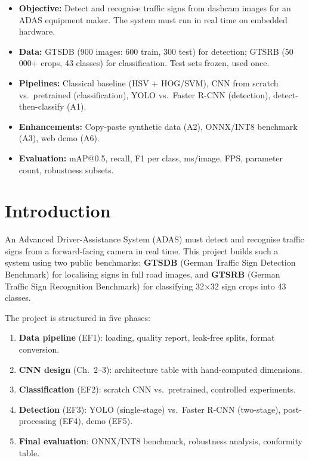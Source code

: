 \documentclass[12pt,a4paper]{article}
\begin{document}
\begin{keybox}[title=Project Summary]
\begin{itemize}[leftmargin=1.5em, itemsep=2pt]
  \item \textbf{Objective:} Detect and recognise traffic signs from dashcam images for an ADAS equipment maker. The system must run in real time on embedded hardware.
  \item \textbf{Data:} GTSDB (900 images: 600 train, 300 test) for detection; GTSRB (50\,000+ crops, 43 classes) for classification. Test sets frozen, used once.
  \item \textbf{Pipelines:} Classical baseline (HSV + HOG/SVM), CNN from scratch vs.\ pretrained (classification), YOLO vs.\ Faster R-CNN (detection), detect-then-classify (A1).
  \item \textbf{Enhancements:} Copy-paste synthetic data (A2), ONNX/INT8 benchmark (A3), web demo (A6).
  \item \textbf{Evaluation:} mAP@0.5, recall, F1 per class, ms/image, FPS, parameter count, robustness subsets.
\end{itemize}
\end{keybox}

\tableofcontents
\newpage

\section{Introduction}
\label{sec:intro}

An Advanced Driver-Assistance System (ADAS) must detect and recognise traffic signs from a forward-facing camera in real time. This project builds such a system using two public benchmarks: \textbf{GTSDB} (German Traffic Sign Detection Benchmark) for localising signs in full road images, and \textbf{GTSRB} (German Traffic Sign Recognition Benchmark) for classifying 32$\times$32 sign crops into 43 classes.

The project is structured in five phases:
\begin{enumerate}[leftmargin=2em]
  \item \textbf{Data pipeline} (EF1): loading, quality report, leak-free splits, format conversion.
  \item \textbf{CNN design} (Ch.~2--3): architecture table with hand-computed dimensions.
  \item \textbf{Classification} (EF2): scratch CNN vs.\ pretrained, controlled experiments.
  \item \textbf{Detection} (EF3): YOLO (single-stage) vs.\ Faster R-CNN (two-stage), post-processing (EF4), demo (EF5).
  \item \textbf{Final evaluation}: ONNX/INT8 benchmark, robustness analysis, conformity table.
\end{enumerate}
\end{document}
